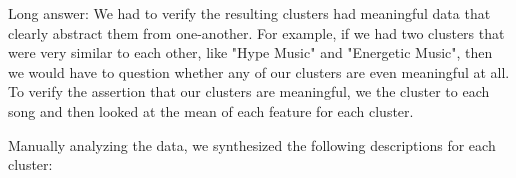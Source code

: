 \documentclass[11pt]{article}
\begin{document}
Long answer: We had to verify the resulting clusters had meaningful data that clearly abstract them from one-another. For example, if we had two clusters that were very similar to each other, like "Hype Music" and "Energetic Music", then we would have to question whether any of our clusters are even meaningful at all. To verify the assertion that our clusters are meaningful, we the cluster to each song and then looked at the mean of each feature for each cluster.

\begin{table}[h]
\centering
{}
\caption{Mean Feature Values per Cluster}
\label{tab:cluster_means}
\end{table}

Manually analyzing the data, we synthesized the following descriptions for each cluster:
\end{document}
